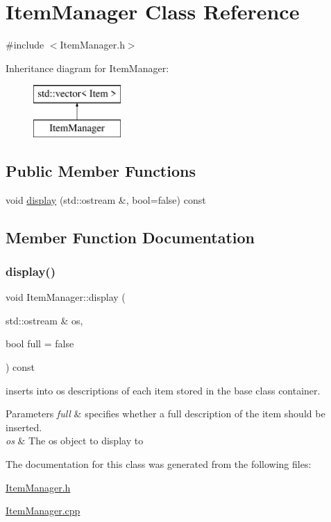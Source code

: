 \hypertarget{class_item_manager}{}\section{Item\+Manager Class Reference}
\label{class_item_manager}


{\ttfamily \#include $<$Item\+Manager.\+h$>$}

Inheritance diagram for Item\+Manager\+:\begin{figure}[H]
\begin{center}
\leavevmode
\includegraphics[height=2.000000cm]{class_item_manager}
\end{center}
\end{figure}
\subsection*{Public Member Functions}
\begin{DoxyCompactItemize}
\item 
void \mbox{\hyperlink{class_item_manager_ad3e190ba89c34cdaa4b11ecbdb6e8722}{display}} (std\+::ostream \&, bool=false) const
\end{DoxyCompactItemize}


\subsection{Member Function Documentation}
\mbox{\label{class_item_manager_ad3e190ba89c34cdaa4b11ecbdb6e8722}} 
\subsubsection{\texorpdfstring{display()}{display()}}
{\footnotesize\ttfamily void Item\+Manager\+::display (\begin{DoxyParamCaption}\item[{std\+::ostream \&}]{os,  }\item[{bool}]{full = {\ttfamily false} }\end{DoxyParamCaption}) const}

inserts into os descriptions of each item stored in the base class container. 
\begin{DoxyParams}{Parameters}
{\em full} & specifies whether a full description of the item should be inserted. \\
\hline
{\em os} & The os object to display to \\
\hline
\end{DoxyParams}


The documentation for this class was generated from the following files\+:\begin{DoxyCompactItemize}
\item 
\mbox{\hyperlink{_item_manager_8h}{Item\+Manager.\+h}}\item 
\mbox{\hyperlink{_item_manager_8cpp}{Item\+Manager.\+cpp}}\end{DoxyCompactItemize}
